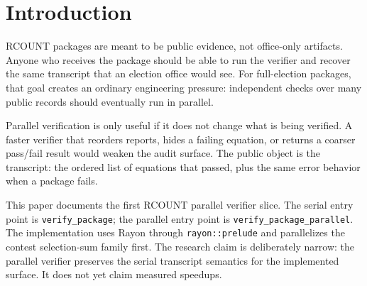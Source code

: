 \section{Introduction}

RCOUNT packages are meant to be public evidence, not office-only artifacts.
Anyone who receives the package should be able to run the verifier and recover
the same transcript that an election office would see. For full-election
packages, that goal creates an ordinary engineering pressure: independent checks
over many public records should eventually run in parallel.

Parallel verification is only useful if it does not change what is being
verified. A faster verifier that reorders reports, hides a failing equation, or
returns a coarser pass/fail result would weaken the audit surface. The public
object is the transcript: the ordered list of equations that passed, plus the
same error behavior when a package fails.

This paper documents the first RCOUNT parallel verifier slice. The serial entry
point is \texttt{verify\_package}; the parallel entry point is
\texttt{verify\_package\_parallel}. The implementation uses Rayon through
\texttt{rayon::prelude} and parallelizes the contest selection-sum family first.
The research claim is deliberately narrow: the parallel verifier preserves the
serial transcript semantics for the implemented surface. It does not yet claim
measured speedups.
